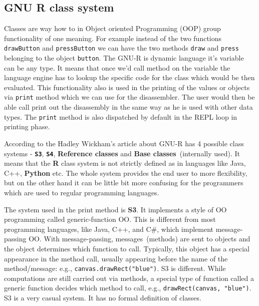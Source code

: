 \documentclass[thesis=M,english]{FITthesis}[2018/10/20]
\newcommand{\code}[1]{\texttt{#1}}
\begin{document}
\subsection{GNU R class system}\label{R-Classes}

Classes are way how to in Object oriented Programming (OOP) group functionality of one meaning. For example instead of the two functions \code{drawButton} and \code{pressButton} we can have the two methods \code{draw} and \code{press} belonging to the object \code{button}. The GNU-R is dynamic language it's variable can be any type. It means that once we'd call method on the variable the language engine has to lookup the specific code for the class which would be then evaluated. This functionality also is used in the printing of the values or objects via \code{print} method which we can use for the disassembler. The user would then be able call print out the disassembly in the same way as he is used with other data types. The \code{print} method is also dispatched by default in the REPL loop in printing phase.

According to the Hadley Wickham's article about GNU-R has 4 possible class systems - \textbf{\code{S3}}, \textbf{\code{S4}}, \textbf{Reference classes} and \textbf{Base classes}~(internally used). It means that the \textbf{R} class system is not strictly defined as in languages like Java, C++, \textbf{Python} etc. The whole system provides the end user to more flexibility, but on the other hand it can be little bit more confusing for the programmers which are used to regular programming languages. 

The system used in the print method is \textbf{S3}. It implements a style of OO programming called generic-function OO. This is different from most programming languages, like Java, C++, and C{\#}, which implement message-passing OO. With message-passing, messages~(methods) are sent to objects and the object determines which function to call. Typically, this object has a special appearance in the method call, usually appearing before the name of the method/message: e.g., \code{canvas.drawRect("blue")}. S3 is different. While computations are still carried out via methods, a special type of function called a generic function decides which method to call, e.g., \code{drawRect(canvas, "blue")}. S3 is a very casual system. It has no formal definition of classes.

\end{document}
